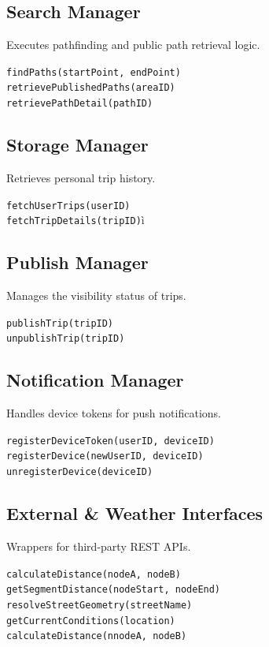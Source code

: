 \subsection{Search Manager}
Executes pathfinding and public path retrieval logic.
    
        \texttt{findPaths(startPoint, endPoint)}\\
        \texttt{retrievePublishedPaths(areaID)}\\
        \texttt{retrievePathDetail(pathID)}

\subsection{Storage Manager}
Retrieves personal trip history.

        \texttt{fetchUserTrips(userID)}\\
        \texttt{fetchTripDetails(tripID)}ì

\subsection{Publish Manager}
Manages the visibility status of trips.

    
        \texttt{publishTrip(tripID)}\\
        \texttt{unpublishTrip(tripID)}

\subsection{Notification Manager}
Handles device tokens for push notifications.

    
        \texttt{registerDeviceToken(userID, deviceID)}\\
        \texttt{registerDevice(newUserID, deviceID)}\\
        \texttt{unregisterDevice(deviceID)}

\subsection{External \& Weather Interfaces}
Wrappers for third-party REST APIs.

    
        \texttt{calculateDistance(nodeA, nodeB)}\\
        \texttt{getSegmentDistance(nodeStart, nodeEnd)}\\
        \texttt{resolveStreetGeometry(streetName)}\\
        \texttt{getCurrentConditions(location)}\\
        \texttt{calculateDistance(nnodeA, nodeB)}

